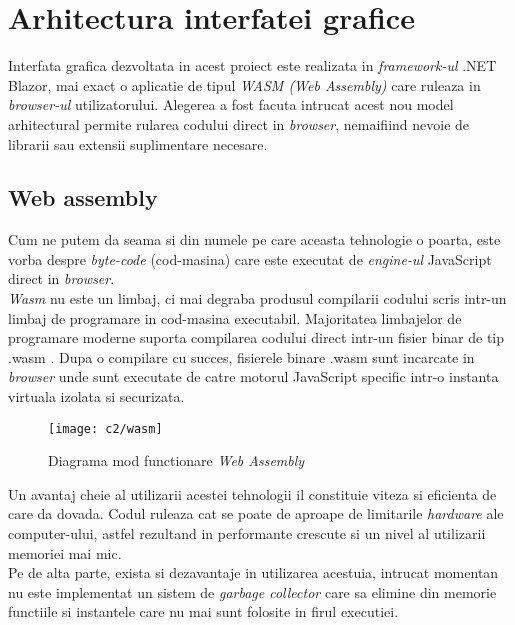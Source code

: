 \section{Arhitectura interfatei grafice}
Interfata grafica dezvoltata in acest proiect este realizata in \textit{framework-ul} .NET Blazor, mai exact o aplicatie de tipul \textit{WASM (Web Assembly)} care ruleaza in \textit{browser-ul} utilizatorului. Alegerea a fost facuta intrucat acest nou model arhitectural permite rularea codului direct in \textit{browser}, nemaifiind nevoie de librarii sau extensii suplimentare necesare.\\

\newpage
\subsection*{Web assembly} 
Cum ne putem da seama si din numele pe care aceasta tehnologie o poarta, este vorba despre \textit{byte-code} (cod-masina) care este executat de \textit{engine-ul} JavaScript direct in \textit{browser}.\\
\textit{Wasm} nu este un limbaj, ci mai degraba produsul compilarii codului scris intr-un limbaj de programare in cod-masina executabil. Majoritatea limbajelor de programare moderne  suporta compilarea codului direct intr-un fisier  binar de tip .wasm . Dupa o compilare cu succes, fisierele binare .wasm sunt incarcate in \textit{browser} unde sunt executate de catre motorul JavaScript specific intr-o instanta virtuala izolata si securizata.\\

\vspace{1cm}
\begin{figure}[h]
	\centering
	
	\texttt{[image: c2/wasm]}
	\caption{Diagrama mod functionare \textit{Web Assembly}}
\end{figure}

Un avantaj cheie al utilizarii acestei tehnologii il constituie viteza si eficienta de care da dovada. Codul ruleaza cat se poate de aproape de limitarile \textit{hardware} ale computer-ului, astfel rezultand in performante crescute si un nivel al utilizarii memoriei mai mic.\\
Pe de alta parte, exista si dezavantaje in utilizarea acestuia, intrucat momentan nu este implementat un sistem de \textit{garbage collector} care sa elimine din memorie functiile si instantele care nu mai sunt folosite in firul executiei.

